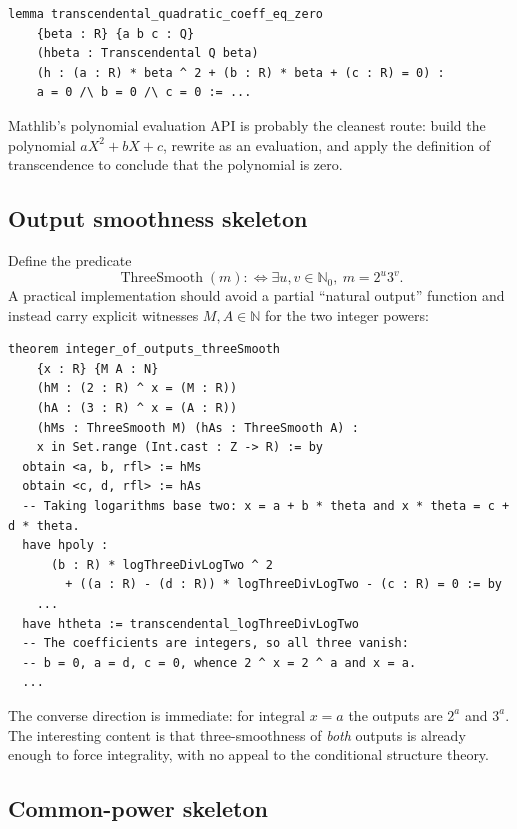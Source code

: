 \documentclass[11pt,oneside]{article}
\theoremstyle{definition}
\theoremstyle{remark}
\newcommand{\N}{\mathbb N}
\newcommand{\Nzero}{\mathbb N_0}
\newcommand{\lean}[1]{\texttt{\detokenize{#1}}}
\begin{document}
\begin{lstlisting}[style=leanstyle,caption={The shared coefficient lemma.},label={a3:lst-quad}]
lemma transcendental_quadratic_coeff_eq_zero
    {beta : R} {a b c : Q}
    (hbeta : Transcendental Q beta)
    (h : (a : R) * beta ^ 2 + (b : R) * beta + (c : R) = 0) :
    a = 0 /\ b = 0 /\ c = 0 := ...
\end{lstlisting}

Mathlib's polynomial evaluation API is probably the cleanest route: build the polynomial
$aX^{2}+bX+c$, rewrite \lean{h} as an evaluation, and apply the definition of transcendence
to conclude that the polynomial is zero.

\subsection{Output smoothness skeleton}
\label{a3:smooth-skeleton}

Define the predicate
\[
  \operatorname{ThreeSmooth}(m)
  :\Longleftrightarrow
  \exists u,v\in\Nzero,\ m=2^{u}3^{v}.
\]
A practical implementation should avoid a partial ``natural output'' function and instead
carry explicit witnesses $M,A\in\N$ for the two integer powers:

\begin{lstlisting}[style=leanstyle,caption={Output smoothness: skeleton.},label={a3:lst-smooth}]
theorem integer_of_outputs_threeSmooth
    {x : R} {M A : N}
    (hM : (2 : R) ^ x = (M : R))
    (hA : (3 : R) ^ x = (A : R))
    (hMs : ThreeSmooth M) (hAs : ThreeSmooth A) :
    x in Set.range (Int.cast : Z -> R) := by
  obtain <a, b, rfl> := hMs
  obtain <c, d, rfl> := hAs
  -- Taking logarithms base two: x = a + b * theta and x * theta = c + d * theta.
  have hpoly :
      (b : R) * logThreeDivLogTwo ^ 2
        + ((a : R) - (d : R)) * logThreeDivLogTwo - (c : R) = 0 := by
    ...
  have htheta := transcendental_logThreeDivLogTwo
  -- The coefficients are integers, so all three vanish:
  -- b = 0, a = d, c = 0, whence 2 ^ x = 2 ^ a and x = a.
  ...
\end{lstlisting}

The converse direction is immediate: for integral $x=a$ the outputs are $2^{a}$ and $3^{a}$.
The interesting content is that three-smoothness of \emph{both} outputs is already enough to
force integrality, with no appeal to the conditional structure theory.

\subsection{Common-power skeleton}
\label{a3:power-skeleton}
\end{document}
